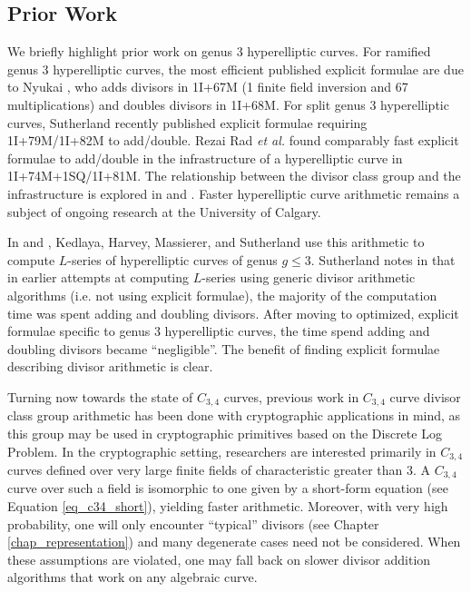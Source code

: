 
\subsection{Prior Work}

We briefly highlight prior work on genus 3 hyperelliptic curves.
For ramified genus 3 hyperelliptic curves, the most efficient published explicit formulae
are due to Nyukai \cite{nyukai06-1} \cite{nyukai06-2},
who adds divisors in 1I+67M (1 finite field inversion and 67 multiplications) and doubles divisors in 1I+68M.
For split genus 3 hyperelliptic curves, Sutherland \cite{sutherland18} recently published explicit formulae
requiring 1I+79M/1I+82M to add/double.
Rezai Rad \emph{et al.} \cite{rezairad16} \cite{rezairad19} found comparably fast explicit formulae to add/double
in the infrastructure of a hyperelliptic curve in 1I+74M+1SQ/1I+81M.
The relationship between the divisor class group and the infrastructure is explored in \cite{rezairad16} and \cite{rezairad19}.
Faster hyperelliptic curve arithmetic remains a subject of ongoing research at the University of Calgary.

In \cite{kedlaya08} and \cite{harvey16}, Kedlaya, Harvey, Massierer, and Sutherland use this arithmetic to compute $L$-series of hyperelliptic curves of genus $g \leq 3$.
Sutherland notes in \cite{sutherland18} that in earlier attempts at computing $L$-series using generic divisor arithmetic algorithms (i.e. not using explicit formulae),
the majority of the computation time was spent adding and doubling divisors.
After moving to optimized, explicit formulae specific to genus 3 hyperelliptic curves, the time spend adding and doubling divisors became ``negligible''.
The benefit of finding explicit formulae describing divisor arithmetic is clear.

Turning now towards the state of $C_{3,4}$ curves, previous work in $C_{3,4}$ curve divisor class group arithmetic
has been done with cryptographic applications in mind, as this group may be used in cryptographic primitives based on the Discrete Log Problem.
In the cryptographic setting, researchers are interested primarily in $C_{3,4}$ curves defined over very large finite fields
of characteristic greater than 3.
A $C_{3,4}$ curve over such a field is isomorphic to one given by a short-form equation (see Equation \ref{eq_c34_short}), yielding faster arithmetic.
Moreover, with very high probability, one will only encounter ``typical'' divisors (see Chapter \ref{chap_representation})
and many degenerate cases need not be considered.
When these assumptions are violated, one may fall back on slower divisor addition algorithms that work on any algebraic curve.

